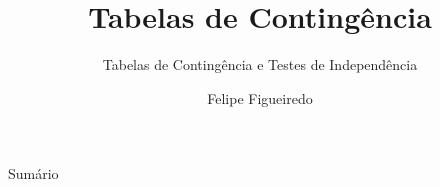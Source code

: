 \documentclass{beamer}
\title%
{Tabelas de Contingência}
\subtitle
{Tabelas de Contingência e Testes de Independência} %
\author%
{Felipe Figueiredo}%
\institute[INTO] %
{Instituto Nacional de Traumatologia e Ortopedia
}
\date%
{}
\begin{document}
\begin{frame}
  \titlepage
\end{frame}

\begin{frame}{Sumário}
  \tableofcontents
\end{frame}







\end{document}
